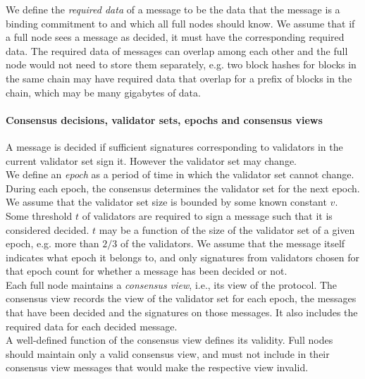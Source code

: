 \noindent We define the {\it required data} of a message to be the data that the message is a binding commitment to 
and which all full nodes should know. We assume that if a full node sees a message as decided, it must have 
the corresponding required data. The required data of messages can overlap among each other and the full node 
would not need to store them separately, e.g. two block hashes for blocks in the same chain may have required data 
that overlap for a prefix of blocks in the chain, which may be many gigabytes of data.

\paragraph{Consensus decisions, validator sets, epochs and consensus views}

\noindent A message is decided if sufficient signatures corresponding to validators in the current validator set sign it. However the validator set may change. \\

\noindent We define an {\it epoch} as a period of time in which the validator set cannot change. During each epoch, the consensus determines the validator set 
for the next epoch. \\

\noindent We assume that the validator set size is bounded by some known constant $v$. Some threshold $t$ of validators are required to sign a message such that it is considered 
decided. $t$ may be a function of the size of the validator set of a given epoch, e.g. more than $2/3$ of the validators. We assume that the message itself indicates what epoch it belongs to, 
and only signatures from validators chosen for that epoch count for whether a message has been decided or not. \\


\noindent Each full node maintains a {\it consensus view}, i.e., its view of the protocol. The consensus view records the view of the validator set for each epoch, 
the messages that have been decided and the signatures on those messages. It also includes the required data for each decided message. \\

\noindent A well-defined function of the consensus view defines its validity. Full nodes should maintain only a valid consensus view, and must not include in their consensus view 
messages that would make the respective view invalid. 

